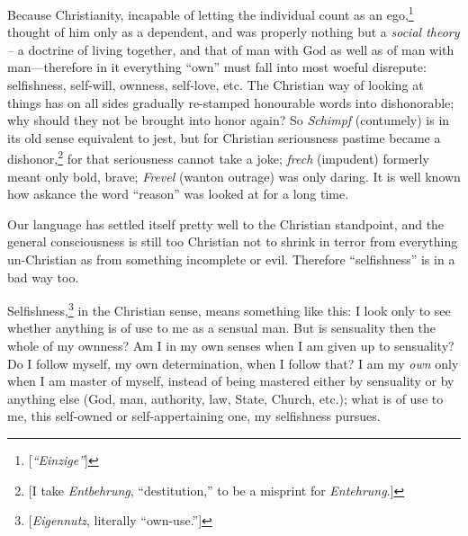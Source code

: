 Because Christianity, incapable of letting the individual count as an 
ego,\footnote{[\textit{``Einzige''}]} thought of him only as a dependent, 
and was properly nothing but a \textit{social theory --} a doctrine of living 
together, and that of man with God as well as of man with man---therefore in 
it everything ``own'' must fall into most woeful disrepute: selfishness, 
self-will, ownness, self-love, etc. The Christian way of looking at things has 
on all sides gradually re-stamped honourable words into dishonorable; why 
should they not be brought into honor again? So \textit{Schimpf} (contumely) 
is in its old sense equivalent to jest, but for Christian seriousness pastime 
became a dishonor,\footnote{[I take \textit{Entbehrung}, ``destitution,'' to 
be a misprint for \textit{Entehrung}.]} for that seriousness cannot take a 
joke; \textit{frech} (impudent) formerly meant only bold, brave; 
\textit{Frevel} (wanton outrage) was only daring. It is well known how askance 
the word ``reason'' was looked at for a long time.

Our language has settled itself pretty well to the Christian standpoint, and 
the general consciousness is still too Christian not to shrink in terror from 
everything un-Christian as from something incomplete or evil. Therefore 
``selfishness'' is in a bad way too.

Selfishness,\footnote{[\textit{Eigennutz}, literally ``own-use.'']} in the 
Christian sense, means something like this: I look only to see whether 
anything is of use to me as a sensual man. But is sensuality then the whole of 
my ownness? Am I in my own senses when I am given up to sensuality? Do I 
follow myself, my own determination, when I follow that? I am my \textit{own} 
only when I am master of myself, instead of being mastered either by 
sensuality or by anything else (God, man, authority, law, State, Church, 
etc.); what is of use to me, this self-owned or self-appertaining one, my 
selfishness pursues.

